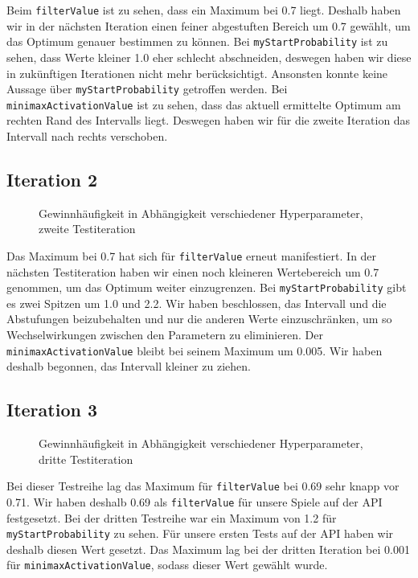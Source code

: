 \documentclass[12pt,a4paper]{article}
\begin{document}
Beim \texttt{filterValue} ist zu sehen, dass ein Maximum bei 0.7 liegt. Deshalb haben wir in der nächsten Iteration einen feiner abgestuften Bereich um 0.7 gewählt, um das Optimum genauer bestimmen zu können. Bei \texttt{myStartProbability} ist zu sehen, dass Werte kleiner 1.0 eher schlecht abschneiden, deswegen haben wir diese in zukünftigen Iterationen nicht mehr berücksichtigt. Ansonsten konnte keine Aussage über \texttt{myStartProbability} getroffen werden. Bei \texttt{minimaxActivationValue} ist zu sehen, dass das aktuell ermittelte Optimum am rechten Rand des Intervalls liegt. Deswegen haben wir für die zweite Iteration das Intervall nach rechts verschoben.

\subsection{Iteration 2}

\begin{figure}[h!]
    \centering
    
    \caption{Gewinnhäufigkeit in Abhängigkeit verschiedener Hyperparameter, zweite Testiteration}
    \label{fig:hyperparameters-2}
\end{figure}

Das Maximum bei 0.7 hat sich für \texttt{filterValue} erneut manifestiert. In der nächsten Testiteration haben wir einen noch kleineren Wertebereich um 0.7 genommen, um das Optimum weiter einzugrenzen. Bei \texttt{myStartProbability} gibt es zwei Spitzen um 1.0 und 2.2. Wir haben beschlossen, das Intervall und die Abstufungen beizubehalten und nur die anderen Werte einzuschränken, um so Wechselwirkungen zwischen den Parametern zu eliminieren. Der \texttt{minimaxActivationValue} bleibt bei seinem Maximum um 0.005. Wir haben deshalb begonnen, das Intervall kleiner zu ziehen.

\subsection{Iteration 3}

\begin{figure}[h!]
    \centering
    
    \caption{Gewinnhäufigkeit in Abhängigkeit verschiedener Hyperparameter, dritte Testiteration}
    \label{fig:hyperparameters-3}
\end{figure}

Bei dieser Testreihe lag das Maximum für \texttt{filterValue} bei 0.69 sehr knapp vor 0.71. Wir haben deshalb 0.69 als \texttt{filterValue} für unsere Spiele auf der API festgesetzt. Bei der dritten Testreihe war ein Maximum von 1.2 für \texttt{myStartProbability} zu sehen. Für unsere ersten Tests auf der API haben wir deshalb diesen Wert gesetzt. Das Maximum lag bei der dritten Iteration bei 0.001 für \texttt{minimaxActivationValue}, sodass dieser Wert gewählt wurde.
\end{document}
